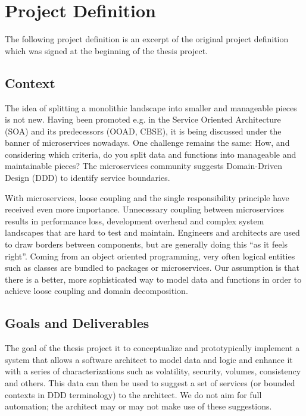 \chapter{Project Definition}
\label{appendix:projectDefinition}

The following project definition is an excerpt of the original project definition which was signed at the beginning of the thesis project.

\section{Context}

The idea of splitting a monolithic landscape into smaller and manageable pieces is not new. Having been promoted e.g. in the Service Oriented Architecture (SOA) and its predecessors (OOAD, CBSE), it is being discussed under the banner of microservices nowadays. One challenge remains the same: How, and considering which criteria, do you split data and functions into manageable and maintainable pieces? The microservices community suggests Domain-Driven Design (DDD) to identify service boundaries. 

With microservices, loose coupling and the single responsibility principle have received even more importance. Unnecessary coupling between microservices results in performance loss, development overhead and complex system landscapes that are hard to test and maintain. Engineers and architects are used to draw borders between components, but are generally doing this “as it feels right”. Coming from an object oriented programming, very often logical entities such as classes are bundled to packages or microservices. Our assumption is that there is a better, more sophisticated way to model data and functions in order to achieve loose coupling and domain decomposition.

\section{Goals and Deliverables}
	
The goal of the thesis project it to conceptualize and prototypically implement a system that allows a software architect to model data and logic and enhance it with a series of characterizations such as volatility, security, volumes, consistency and others. This data can then be used to suggest a set of services (or bounded contexts in DDD terminology) to the architect. We do not aim for full automation; the architect may or may not make use of these suggestions. 


